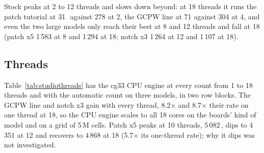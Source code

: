 \begin{table}[H]\centering\small
{}
\caption{M5 Max: stock v0.37.0 at 1, 2, 3, 4, 6, 8, 12 and 18 threads on the six models, in \MC, medians of 3 interleaved
rounds with half the steps of the speed table; cg33 at 18 threads ran in the same rounds. Last column: the paired ratio of
cg33 at 18 threads to stock's best count (the column of Table~\ref{tab:studiospeed}). The other processes used a median of
0.22 to 0.33 cores per model, except the patch tutorial (1.51 cores, at most 1.63). All probes are identical to stock's on
one thread. , sections 1 and 2.}\label{tab:studiostock}
\end{table}

Stock peaks at 2 to 12 threads and slows down beyond: at 18 threads it runs the patch tutorial at 31\,\MC\ against 278 at 2,
the GCPW line at 71 against 304 at 4, and even the two large models only reach their best at 8 and 12 threads and fall at
18 (patch x5 1\,583 at 8 and 1\,294 at 18; notch x3 1\,264 at 12 and 1\,107 at 18).

\subsection*{Threads}
Table~\ref{tab:studiothreads} has the cg33 CPU engine at every count from 1 to 18 threads and with the automatic count on
three models, in two row blocks. The GCPW line and notch x3 gain with every thread, 8.2$\times$ and 8.7$\times$ their rate
on one thread at 18, so the CPU engine scales to all 18 cores on the boards' kind of model and on a grid of 5\,M cells. Patch x5
peaks at 10 threads, 5\,082\,\MC, dips to 4\,351 at 12 and recovers to 4\,868 at 18 (5.7$\times$ its one-thread rate); why it dips
was not investigated.


